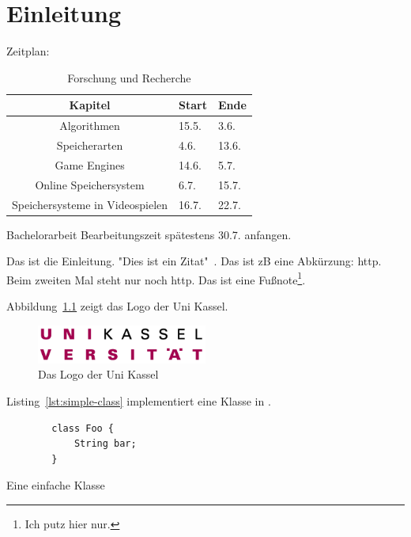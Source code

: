 \chapter{Einleitung}\label{ch:introduction}

Zeitplan:

\begin{table}[htp]
    \centering
    \caption{Forschung und Recherche}
    \begin{tabular}{|c|l|l|}
    \hline
        Kapitel & Start & Ende \\ \hline
        Algorithmen  & 15.5. & 3.6. \\ \hline
        Speicherarten  & 4.6. & 13.6. \\ \hline
        Game Engines  & 14.6. & 5.7. \\ \hline
        Online Speichersystem & 6.7. & 15.7. \\ \hline
        Speichersysteme in Videospielen  & 16.7. & 22.7. \\ \hline
    \end{tabular}
    \label{tbl:zeitplan1}
\end{table}

Bachelorarbeit Bearbeitungszeit spätestens 30.7. anfangen.

\newpage

Das ist die Einleitung.
"Dies ist ein Zitat"~\cite{dragon-book}.
Das ist \ac{zB} eine Abkürzung: \ac{http}.
Beim zweiten Mal steht nur noch \ac{http}.
Das ist eine Fußnote\footnote{Ich putz hier nur.}.

Abbildung~\ref{fig:uni-kassel-logo} zeigt das Logo der Uni Kassel.

\begin{figure}[htp] %
    \centering
    \includegraphics[width=0.5\textwidth]{images/Logo_UniKassel.png} %
    \caption{Das Logo der Uni Kassel}
    \label{fig:uni-kassel-logo}
\end{figure}

Listing~\ref{lst:simple-class} implementiert eine Klasse in .

\begin{listing}[htp]
    \begin{verbatim}
        class Foo {
            String bar;
        }
    \end{verbatim}
    \caption{Eine einfache Klasse}
    \label{lst:simple-class}
\end{listing}


